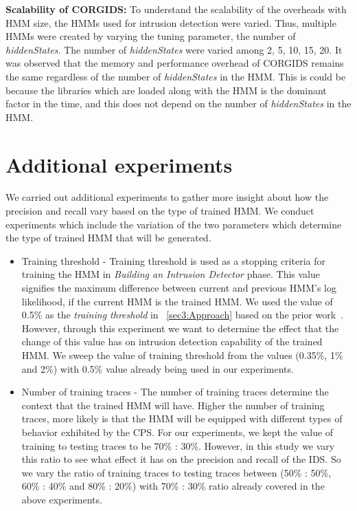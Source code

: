 \bigskip
\textbf{Scalability of CORGIDS:} To understand the scalability of the overheads with HMM size, the HMMs used for intrusion detection were varied. Thus, multiple HMMs were created by varying the tuning parameter, the number of \textit{hiddenStates}. The number of \textit{hiddenStates} were varied among {2, 5, 10, 15, 20}. It was observed that the memory and performance overhead of CORGIDS remains the same regardless of the number of \textit{hiddenStates} in the HMM. This is could be because the libraries which are loaded along with the HMM is the dominant factor in the time, and this does not depend on the number of \textit{hiddenStates} in the HMM.

\section{Additional experiments}
We carried out additional experiments to gather more insight about how the precision and recall vary based on the type of trained HMM.
We conduct experiments which include the variation of the two parameters which determine the type of trained HMM that will be generated.
\begin{itemize}
\item Training threshold - Training threshold is used as a stopping criteria for training the HMM in \textit{Building an Intrusion Detector} phase. This value signifies the maximum difference between current and previous HMM's log likelihood, if the current HMM is the trained HMM. We used the value of 0.5\% as the \textit{training threshold} in ~\autoref{sec3:Approach} based on the prior work~\cite{ferrer2000influence}. However, through this experiment we want to determine the effect that the change of this value has on intrusion detection capability of the trained HMM. We sweep the value of training threshold from the values (0.35\%, 1\% and 2\%) with 0.5\% value already being used in our experiments.

\item Number of training traces - The number of training traces determine the context that the trained HMM will have. Higher the number of training traces, more likely is that the HMM will be equipped with different types of behavior exhibited by the CPS. For our experiments, we kept the value of training to testing traces to be 70\% : 30\%. However, in this study we vary this ratio to see what effect it has on the precision and recall of the IDS. So we vary the ratio of training traces to testing traces between (50\% : 50\%, 60\% : 40\% and 80\% : 20\%) with 70\% : 30\% ratio already covered in the above experiments.
\end{itemize}

